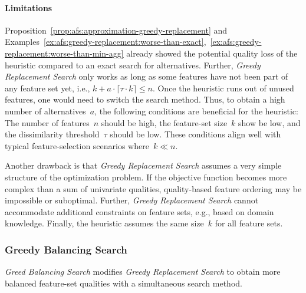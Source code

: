 \documentclass{article}
\theoremstyle{definition}
\begin{document}
\paragraph{Limitations}

Proposition~\ref{prop:afs:approximation-greedy-replacement} and Examples~\ref{ex:afs:greedy-replacement:worse-than-exact},~\ref{ex:afs:greedy-replacement:worse-than-min-agg} already showed the potential quality loss of the heuristic compared to an exact search for alternatives.
Further, \emph{Greedy Replacement Search} only works as long as some features have not been part of any feature set yet, i.e., $k + a \cdot \lceil \tau \cdot k \rceil \leq n$.
Once the heuristic runs out of unused features, one would need to switch the search method.
Thus, to obtain a high number of alternatives~$a$, the following conditions are beneficial for the heuristic:
The number of features~$n$ should be high, the feature-set size~$k$ show be low, and the dissimilarity threshold~$\tau$ should be low.
These conditions align well with typical feature-selection scenarios where~$k \ll n$.

Another drawback is that \emph{Greedy Replacement Search} assumes a very simple structure of the optimization problem.
If the objective function becomes more complex than a sum of univariate qualities, quality-based feature ordering may be impossible or suboptimal.
Further, \emph{Greedy Replacement Search} cannot accommodate additional constraints on feature sets, e.g., based on domain knowledge.
Finally, the heuristic assumes the same size~$k$ for all feature sets.

\subsubsection{Greedy Balancing Search}
\label{sec:afs:approach:univariate-heuristics:greedy-balancing}

\emph{Greed Balancing Search} modifies \emph{Greedy Replacement Search} to obtain more balanced feature-set qualities with a simultaneous search method.
\end{document}
